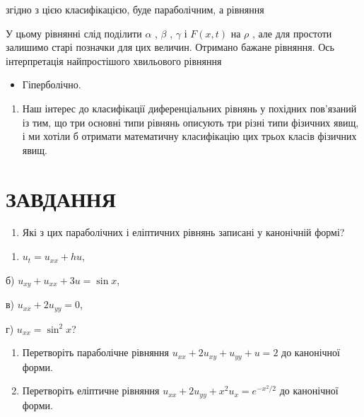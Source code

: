 \documentclass[
  ukrainian,
]{article}
\providecommand{\tightlist}{%
  \setlength{\itemsep}{0pt}\setlength{\parskip}{0pt}}
\begin{document}
згідно з цією класифікацією, буде параболічним, а рівняння

У цьому рівнянні слід поділити \(\alpha\) , \(\beta\) , \(\gamma\) і
\(F(x,t)\) на \(\rho\) , але для простоти залишимо старі позначки для
цих величин. Отримано бажане рівняння. Ось інтерпретація найпростішого
хвильового рівняння

\begin{itemize}
\tightlist
\item
  Гіперболічно.
\end{itemize}

\begin{enumerate}
\def\labelenumi{\arabic{enumi}.}
\setcounter{enumi}{1}
\tightlist
\item
  Наш інтерес до класифікації диференціальних рівнянь у похідних
  пов'язаний із тим, що три основні типи рівнянь описують три різні типи
  фізичних явищ, і ми хотіли б отримати математичну класифікацію цих
  трьох класів фізичних явищ.
\end{enumerate}

\section{ЗАВДАННЯ}\label{ux437ux430ux432ux434ux430ux43dux43dux44f-1}

\begin{enumerate}
\def\labelenumi{\arabic{enumi}.}
\tightlist
\item
  Які з цих параболічних і еліптичних рівнянь записані у канонічній
  формі?
\end{enumerate}

\begin{enumerate}
\def\labelenumi{\alph{enumi})}
\tightlist
\item
  \(u_t = u_{xx} + hu\),
\end{enumerate}

б) \(u_{xy} + u_{xx} + 3u = \sin x\),

в) \(u_{xx} + 2u_{yy} = 0\),

г) \(u_{xx} = \sin^2 x\)?

\begin{enumerate}
\def\labelenumi{\arabic{enumi}.}
\setcounter{enumi}{1}
\item
  Перетворіть параболічне рівняння \(u_{xx} + 2u_{xy} + u_{yy} + u = 2\)
  до канонічної форми.
\item
  Перетворіть еліптичне рівняння
  \(u_{xx} + 2u_{yy} + x^2 u_x = e^{-x^2/2}\) до канонічної форми.
\end{enumerate}
\end{document}
